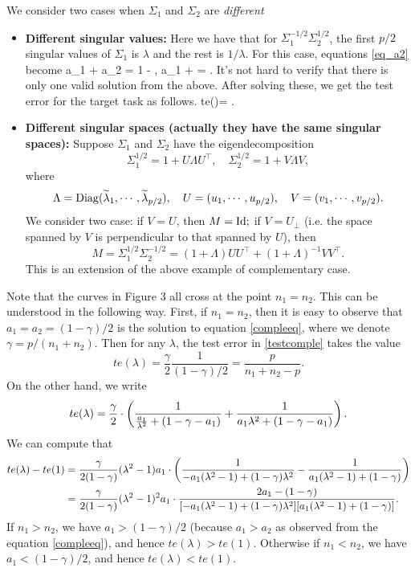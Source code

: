 \smallskip
\begin{example}
	We consider two cases when $\Sigma_1$ and $\Sigma_2$ are \textit{different}
\begin{itemize}
	\item {\bf Different singular values:} Here we have that for $\Sigma_1^{-1/2}\Sigma_2^{1/2}$, the first $p/2$ singular values of $\Sigma_1$ is $\lambda$ and the rest is $1/\lambda$.
For this case, equations \eqref{eq_a2} become
\be\label{compleeq} a_1 + a_2 = 1 - , a_1 + \cdot {} = . \ee
It's not hard to verify that there is only one valid solution from the above.
After solving these, we get the test error for the target task as follows.
\be\label{testcomple}
te(\lambda)= \cdot {}.\ee
	\item {\bf Different singular spaces {\color{blue}(actually they have the same singular spaces)}:}
	Suppose $\Sigma_1$ and $\Sigma_2$ have the eigendecomposition
$$\Sigma_1^{1/2} = 1+ U\Lambda U^\top, \quad \Sigma_2^{1/2} = 1+ V\Lambda V,$$
where
$$\Lambda = \operatorname{Diag}(\widetilde\lambda_1,\cdots, \widetilde\lambda_{p/2}), \quad U= (u_1,\cdots, u_{p/2}), \quad V= (v_1,\cdots, v_{p/2}).$$
We consider two case: if $V=U$, then $M=\operatorname{Id};$ if $V=U_\perp$ (i.e. the space spanned by $V$ is perpendicular to that spanned by $U$), then
$$M=\Sigma_1^{1/2} \Sigma_2^{-1/2}=(1+\Lambda)UU^\top + (1+\Lambda)^{-1}V V^\top .$$
This is an extension of the above example of complementary case.
\end{itemize}
\end{example}

{\color{blue} Note that the curves in Figure 3 all cross at the point $n_1=n_2$. This can be understood in the following way.
First, if $n_1=n_2$, then it is easy to observe that $a_1=a_2=(1-\gamma)/2$ is the solution to equation \eqref{compleeq}, where we denote $ \gamma=p/(n_1+n_2)$. Then for any $\lambda$, the test error in \eqref{testcomple} takes the value
$$te(\lambda)= \frac{\gamma}{2}\frac{1}{(1-\gamma)/2}=\frac{p}{n_1+n_2-p}.$$
On the other hand, we write
$$te(\lambda)=\frac{\gamma}{2} \cdot \left({\frac{1}{\frac{a_1}{\lambda^2} + (1-\gamma - a_1)} + \frac{1}{a_1\lambda^2 + (1-\gamma - a_1)}}\right).$$
We can compute that
\begin{align*}
te(\lambda) - te(1)&= \frac{\gamma}{2(1-\gamma)} (\lambda^2-1)a_1\cdot \left({  \frac{1}{ -a_1(\lambda^2-1)+(1-\gamma)\lambda^2 } - \frac{1}{a_1(\lambda^2-1) + (1-\gamma)}}\right) \\
&= \frac{\gamma}{2(1-\gamma)} (\lambda^2-1)^2 a_1\cdot  \frac{2a_1 - (1-\gamma) }{[-a_1(\lambda^2-1)+(1-\gamma)\lambda^2 ][a_1(\lambda^2-1) + (1-\gamma)]} .
\end{align*}
If $n_1>n_2$, we have $a_1>(1-\gamma)/2$ (because $a_1>a_2$ as observed from the equation \eqref{compleeq}), and hence $te(\lambda)>te(1)$. Otherwise if $n_1< n_2$, we have $a_1< (1-\gamma)/2$, and hence $te(\lambda)< te(1)$.
}

